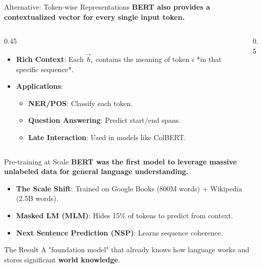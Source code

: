 \documentclass[aspectratio=169]{beamer}
\newif\ifanimated
\newcommand{\cpause}{\ifanimated\pause\fi}
\begin{document}
\begin{frame}{Alternative: Token-wise Representations}
\textbf{BERT also provides a contextualized vector for every single input token.}

\vspace{0.8em}
\begin{columns}
\begin{column}{0.45\textwidth}
\begin{itemize}
    \item \textbf{Rich Context}: Each $\vec{h}_i$ contains the meaning of token $i$ *in that specific sequence*.
    \item \textbf{Applications}:
        \begin{itemize}
            \item \textbf{NER/POS}: Classify each token.
            \item \textbf{Question Answering}: Predict start/end spans.
            \item \textbf{Late Interaction}: Used in models like ColBERT.
        \end{itemize}
\end{itemize}
\end{column}

\begin{column}{0.5\textwidth}
\begin{center}

\end{center}
\end{column}
\end{columns}
\end{frame}

\begin{frame}{Pre-training at Scale}
\textbf{BERT was the first model to leverage massive unlabeled data for general language understanding.}

\vspace{0.8em}
\begin{itemize}
    \item \textbf{The Scale Shift}: Trained on Google Books (800M words) + Wikipedia (2.5B words).
    \item \textbf{Masked LM (MLM)}: Hides 15\% of tokens to predict from context.
    \item \textbf{Next Sentence Prediction (NSP)}: Learns sequence coherence.
\end{itemize}

\vspace{1em}
\cpause
\begin{block}{The Result}
A "foundation model" that already knows how language works and stores significant \textbf{world knowledge}.
\end{block}
\end{frame}
\end{document}
